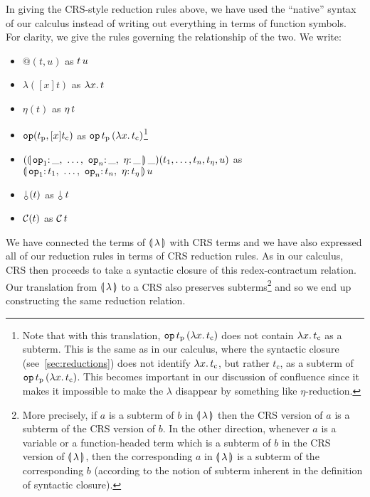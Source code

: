 In giving the CRS-style reduction rules above, we have used the ``native''
syntax of our calculus instead of writing out everything in terms of
function symbols. For clarity, we give the rules governing the relationship
of the two. We write:

\begin{itemize}
\item $@(t,u)$ as $t\,u$
\item $\lambda([x]t)$ as $\lambda x.\, t$
\item $\eta(t)$ as $\eta\,t$
\item $\mathtt{op}(t_{\mathrm{p}},[x]t_{\mathrm{c}})$ as
  $\mathtt{op}\,t_{\mathrm{p}}\,(\lambda x.\, t_{\mathrm{c}})$\footnote{Note
  that with this translation,
  $\mathtt{op}\,t_{\mathrm{p}}\,(\lambda x.\, t_{\mathrm{c}})$ does not
  contain $\lambda x.\, t_{\mathrm{c}}$ as a subterm. This is the same as in
  our calculus, where the syntactic closure (see~\ref{sec:reductions}) does
  not identify $\lambda x.\, t_{\mathrm{c}}$, but rather $t_{\mathrm{c}}$, as a
  subterm of
  $\mathtt{op}\,t_{\mathrm{p}}\,(\lambda x.\, t_{\mathrm{c}})$. This becomes
  important in our discussion of confluence since it makes it impossible to
  make the $\lambda$ disappear by something like $\eta$-reduction.}
\item
  $(\ap{\banana{\onto{\op{op}_1}{\_},\ \ldots,\ \onto{\op{op}_n}{\_},\ \onto{\eta}{\_}}}{\_})(t_1,\ldots,t_n,t_\eta,u)$
  as $\ap{\banana{\onto{\op{op}_1}{t_1},\ \ldots,\ \onto{\op{op}_n}{t_n},\ \onto{\eta}{t_\eta}}}{u}$
\item $\cherry(t)$ as $\ap{\cherry}{t}$
\item $\mathcal{C}(t)$ as $\mathcal{C}\,t$
\end{itemize}

We have connected the terms of $\llparenthesis \, \lambda \, \rrparenthesis$ with CRS terms and we
have also expressed all of our reduction rules in terms of CRS reduction
rules. As in our calculus, CRS then proceeds to take a syntactic closure of
this redex-contractum relation. Our translation from $\llparenthesis \, \lambda \, \rrparenthesis$ to
a CRS also preserves subterms\footnote{More precisely, if $a$ is a subterm
  of $b$ in $\llparenthesis \, \lambda \, \rrparenthesis$ then the CRS version of $a$ is a subterm of
  the CRS version of $b$. In the other direction, whenever $a$ is a
  variable or a function-headed term which is a subterm of $b$ in the CRS
  version of $\llparenthesis \, \lambda \, \rrparenthesis$, then the corresponding $a$ in
  $\llparenthesis \, \lambda \, \rrparenthesis$ is a subterm of the corresponding $b$ (according to
  the notion of subterm inherent in the definition of syntactic closure).}
and so we end up constructing the same reduction relation.


